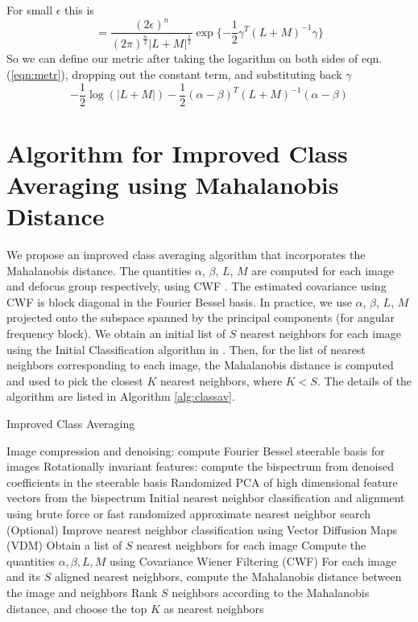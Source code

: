 \documentclass{article}
\begin{document}
For small $\epsilon$ this is
\begin{equation}
= \frac{(2 \epsilon)^n}{(2 \pi)^{\frac{n}{2}} |L + M|^{\frac{1}{2}}} \exp\{-\frac{1}{2}\gamma^T(L+M)^{-1}\gamma\} 
\label{eqn:metr}
\end{equation}
So we can define our metric after taking the logarithm on both sides of eqn.(\ref{eqn:metr}), dropping out the constant term, and substituting back $\gamma$
\begin{equation}
 -\frac{1}{2}\log(|L + M|) -\frac{1}{2}(\alpha - \beta)^T(L+M)^{-1}(\alpha -\beta)
\end{equation}


\section{Algorithm for Improved Class Averaging using Mahalanobis Distance}

We propose an improved class averaging algorithm that incorporates the Mahalanobis distance. The quantities $\alpha$, $\beta$, $L$, $M$ are computed for each image and defocus group respectively, using CWF \cite{cwf}. The estimated covariance using CWF is block diagonal in the Fourier Bessel basis. In practice, we use $\alpha$, $\beta$, $L$, $M$ projected onto the subspace spanned by the principal components (for angular frequency block). We obtain an initial list of $S$ nearest neighbors for each image using the Initial Classification algorithm in \cite{zhao1}. Then, for the list of nearest neighbors corresponding to each image, the Mahalanobis distance is computed and used to pick the closest $K$ nearest neighbors, where $K<S$. The details of the algorithm are listed in Algorithm \ref{alg:classav}. 

\begin{algorithm}
\caption{Improved Class Averaging }
\label{alg:classav}
\begin{algorithmic}[1]
\State Image compression and denoising: compute Fourier Bessel steerable basis for images \cite{ffbspca}
\State Rotationally invariant features: compute the bispectrum from denoised coefficients in the steerable basis
\State Randomized PCA\cite{rokhlin} of high dimensional feature vectors from the bispectrum
\State Initial nearest neighbor classification and alignment using brute force or fast randomized approximate nearest neighbor search \cite{fastnn}
\State (Optional) Improve nearest neighbor classification using Vector Diffusion Maps (VDM) \cite{vdm}
\State Obtain a list of $S$ nearest neighbors for each image
\EndProcedure
{}
\State Compute the quantities $\alpha, \beta, L, M$ using Covariance Wiener Filtering (CWF) \cite{cwf}
\State For each image and its $S$ aligned nearest neighbors, compute the Mahalanobis distance between the image and neighbors
\State Rank $S$ neighbors according to the Mahalanobis distance, and choose the top $K$ as nearest neighbors
\EndProcedure
{}
\EndProcedure
\end{algorithmic}
\end{algorithm}
\end{document}

